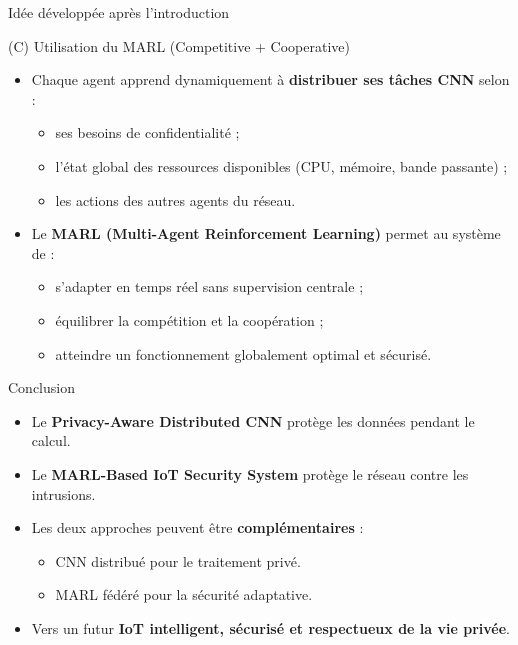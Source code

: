 \documentclass{beamer}
\begin{document}
\begin{frame}{Idée développée après l’introduction}
\begin{block}{ (C) Utilisation du MARL (Competitive + Cooperative)}
\begin{itemize}
    \item Chaque agent apprend dynamiquement à \textbf{distribuer ses tâches CNN} selon :
    \begin{itemize}
        \item ses besoins de confidentialité ;
        \item l’état global des ressources disponibles (CPU, mémoire, bande passante) ;
        \item les actions des autres agents du réseau.
    \end{itemize}
    \item Le \textbf{MARL (Multi-Agent Reinforcement Learning)} permet au système de :
    \begin{itemize}
        \item s’adapter en temps réel sans supervision centrale ;
        \item équilibrer la compétition et la coopération ;
        \item atteindre un fonctionnement globalement optimal et sécurisé.
    \end{itemize}
\end{itemize}
\end{block}
\end{frame}

\begin{frame}{Conclusion}
\begin{itemize}
    \item  Le \textbf{Privacy-Aware Distributed CNN} protège les données pendant le calcul.
    \item  Le \textbf{MARL-Based IoT Security System} protège le réseau contre les intrusions.
    \item  Les deux approches peuvent être \textbf{complémentaires} :
    \begin{itemize}
        \item CNN distribué pour le traitement privé.
        \item MARL fédéré pour la sécurité adaptative.
    \end{itemize}
    \item  Vers un futur \textbf{IoT intelligent, sécurisé et respectueux de la vie privée}.
\end{itemize}
\end{frame}
\end{document}
